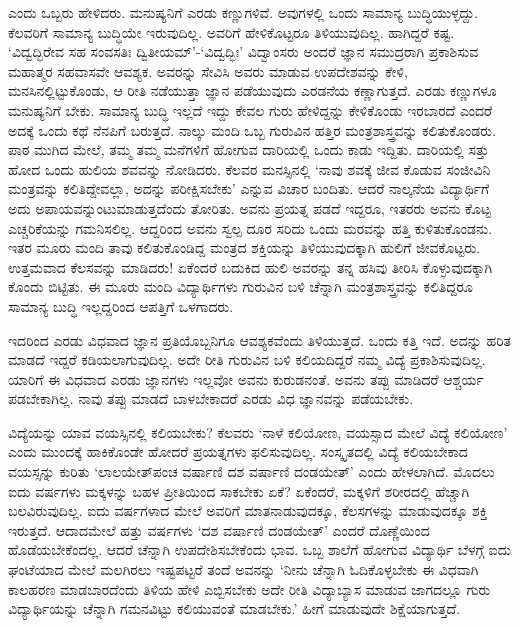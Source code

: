 ಎಂದು ಒಬ್ಬರು ಹೇಳಿದರು. ಮನುಷ್ಯನಿಗೆ ಎರಡು ಕಣ್ಣುಗಳಿವೆ. ಅವುಗಳಲ್ಲಿ ಒಂದು ಸಾಮಾನ್ಯ ಬುದ್ಧಿಯುಳ್ಳದ್ದು. ಕೆಲವರಿಗೆ ಸಾಮಾನ್ಯ ಬುದ್ಧಿಯೇ 
ಇರುವುದಿಲ್ಲ. ಅವರಿಗೆ ಹೇಳಿಕೊಟ್ಟರೂ ತಿಳಿಯುವುದಿಲ್ಲ. ಹಾಗಿದ್ದರೆ ಕಷ್ಟ. `ವಿದ್ವದ್ಭಿರೇವ ಸಹ ಸಂವಸತಿಃ ದ್ವಿತೀಯಮ್'-`ವಿದ್ವದ್ಭಿಃ' ವಿದ್ವಾಂಸರು ಅಂದರೆ ಜ್ಞಾನ 
ಸಮುದ್ರರಾಗಿ ಪ್ರಕಾಶಿಸುವ ಮಹಾತ್ಮರ ಸಹವಾಸವೇ ಆವಶ್ಯಕ. ಅವರನ್ನು ಸೇವಿಸಿ ಅವರು ಮಾಡುವ ಉಪದೇಶವನ್ನು ಕೇಳಿ, ಮನಸಿನಲ್ಲಿಟ್ಟುಕೊಂಡು, ಆ 
ರೀತಿ ನಡೆಯುತ್ತಾ ಜ್ಞಾನ ಪಡೆಯುವುದು ಎರಡನೆಯ ಕಣ್ಣಾಗುತ್ತದೆ. ಎರಡು ಕಣ್ಣುಗಳೂ ಮನುಷ್ಯನಿಗೆ ಬೇಕು. ಸಾಮಾನ್ಯ ಬುದ್ಧಿ ಇಲ್ಲದೆ 
ಇದ್ದು ಕೇವಲ ಗುರು ಹೇಳಿದ್ದನ್ನು ಕೇಳಿಕೊಂಡು ಇರಬಾರದೆ ಎಂದರೆ ಅದಕ್ಕೆ ಒಂದು ಕಥೆ ನೆನಪಿಗೆ ಬರುತ್ತದೆ. ನಾಲ್ಕು ಮಂದಿ ಒಬ್ಬ ಗುರುವಿನ 
ಹತ್ತಿರ ಮಂತ್ರಶಾಸ್ತ್ರವನ್ನು ಕಲಿತುಕೊಂಡರು. ಪಾಠ ಮುಗಿದ ಮೇಲೆ, ತಮ್ಮ ತಮ್ಮ ಮನೆಗಳಿಗೆ ಹೋಗುವ ದಾರಿಯಲ್ಲಿ ಒಂದು ಕಾಡು 
ಇದ್ದಿತು. ದಾರಿಯಲ್ಲಿ ಸತ್ತು ಹೋದ ಒಂದು ಹುಲಿಯ ಶವವನ್ನು ನೋಡಿದರು. ಕೆಲವರ ಮನಸ್ಸಿನಲ್ಲಿ `ನಾವು ಶವಕ್ಕೆ ಜೀವ ಕೊಡುವ ಸಂಜೀವಿನಿ 
ಮಂತ್ರವನ್ನು ಕಲಿತಿದ್ದೇವಲ್ಲಾ, ಅದನ್ನು ಪರೀಕ್ಷಿಸಬೇಕು' ಎನ್ನುವ ವಿಚಾರ ಬಂದಿತು. ಆದರೆ ನಾಲ್ಕನೆಯ ವಿದ್ಯಾರ್ಥಿಗೆ ಅದು 
ಅಪಾಯವನ್ನುಂಟುಮಾಡುತ್ತದೆಂದು ತೋರಿತು. ಅವನು ಪ್ರಯತ್ನ ಪಡದೆ ಇದ್ದರೂ, ಇತರರು ಅವನು ಕೊಟ್ಟ ಎಚ್ಚರಿಕೆಯನ್ನು ಗಮನಿಸಲಿಲ್ಲ. ಆದ್ದರಿಂದ ಅವನು ಸ್ವಲ್ಪ ದೂರ ಸರಿದು ಒಂದು ಮರವನ್ನು ಹತ್ತಿ ಕುಳಿತುಕೊಂಡನು. ಇತರ ಮೂರು ಮಂದಿ ತಾವು ಕಲಿತುಕೊಂಡಿದ್ದ ಮಂತ್ರದ ಶಕ್ತಿಯನ್ನು ತಿಳಿಯುವುದಕ್ಕಾಗಿ ಹುಲಿಗೆ ಜೀವಕೊಟ್ಟರು. ಉತ್ತಮವಾದ ಕೆಲಸವನ್ನು ಮಾಡಿದರು! ಏಕೆಂದರೆ ಬದುಕಿದ ಹುಲಿ ಅವರನ್ನು ತನ್ನ ಹಸಿವು ತೀರಿಸಿ ಕೊಳ್ಳುವುದಕ್ಕಾಗಿ ಕೊಂದು ಬಿಟ್ಟಿತು. ಈ ಮೂರು ಮಂದಿ ವಿದ್ಯಾರ್ಥಿಗಳು ಗುರುವಿನ ಬಳಿ ಚೆನ್ನಾಗಿ ಮಂತ್ರಶಾಸ್ತ್ರವನ್ನು ಕಲಿತಿದ್ದರೂ ಸಾಮಾನ್ಯ ಬುದ್ಧಿ ಇಲ್ಲದ್ದರಿಂದ ಆಪತ್ತಿಗೆ ಒಳಗಾದರು. 

ಇದರಿಂದ ಎರಡು ವಿಧವಾದ ಜ್ಞಾನ ಪ್ರತಿಯೊಬ್ಬನಿಗೂ ಆವಶ್ಯಕವೆಂದು ತಿಳಿಯುತ್ತದೆ. ಒಂದು ಕತ್ತಿ ಇದೆ. ಅದನ್ನು ಹರಿತ ಮಾಡದೆ ಇದ್ದರೆ 
ಕಡಿಯಲಾಗುವುದಿಲ್ಲ. ಅದೇ ರೀತಿ ಗುರುವಿನ ಬಳಿ ಕಲಿಯದಿದ್ದರೆ ನಮ್ಮ ವಿದ್ಯೆ ಪ್ರಕಾಶಿಸುವುದಿಲ್ಲ. ಯಾರಿಗೆ ಈ ವಿಧವಾದ ಎರಡು ಜ್ಞಾನಗಳು 
ಇಲ್ಲವೋ ಅವನು ಕುರುಡನಂತೆ. ಅವನು ತಪ್ಪು ಮಾಡಿದರೆ ಆಶ್ಚರ್ಯ ಪಡಬೇಕಾಗಿಲ್ಲ. ನಾವು ತಪ್ಪು ಮಾಡದೆ ಬಾಳಬೇಕಾದರೆ ಎರಡು ವಿಧ ಜ್ಞಾನವನ್ನು ಪಡೆಯಬೇಕು.

ವಿದ್ಯೆಯನ್ನು ಯಾವ ವಯಸ್ಸಿನಲ್ಲಿ ಕಲಿಯಬೇಕು? ಕೆಲವರು `ನಾಳೆ ಕಲಿಯೋಣ, ವಯಸ್ಸಾದ ಮೇಲೆ ವಿದ್ಯೆ ಕಲಿಯೋಣ' ಎಂದು ಮುಂದಕ್ಕೆ 
ಹಾಕಿಕೊಂಡೇ ಹೋದರೆ ಪ್ರಯತ್ನಗಳು ಫಲಿಸುವುದಿಲ್ಲ. ಸಂಸ್ಕೃತದಲ್ಲಿ ವಿದ್ಯೆ ಕಲಿಯಬೇಕಾದ ವಯಸ್ಸನ್ನು ಕುರಿತು `ಲಾಲಯೇತ್‌ಪಂಚ 
ವರ್ಷಾಣಿ ದಶ ವರ್ಷಾಣಿ ದಂಡಯೇತ್' ಎಂದು ಹೇಳಲಾಗಿದೆ. ಮೊದಲು ಐದು ವರ್ಷಗಳು ಮಕ್ಕಳನ್ನು ಬಹಳ ಪ್ರೀತಿಯಿಂದ ಸಾಕಬೇಕು ಏಕೆ? ಏಕೆಂದರೆ, 
ಮಕ್ಕಳಿಗೆ ಶರೀರದಲ್ಲಿ ಹೆಚ್ಚಾಗಿ ಬಲವಿರುವುದಿಲ್ಲ. ಐದು ವರ್ಷಗಳಾದ ಮೇಲೆ ಅವರಿಗೆ ಮಾತನಾಡುವುದಕ್ಕೂ, ಕೆಲಸಗಳನ್ನು ಮಾಡುವುದಕ್ಕೂ 
ಶಕ್ತಿ ಇರುತ್ತದೆ. ಆದಾದಮೇಲೆ ಹತ್ತು ವರ್ಷಗಳು `ದಶ ವರ್ಷಾಣಿ ದಂಡಯೇತ್' ಎಂದರೆ ದೊಣ್ಣೆಯಿಂದ ಹೊಡೆಯಬೇಕೆಂದಲ್ಲ. ಆದರೆ 
ಚೆನ್ನಾಗಿ ಉಪದೇಶಿಸಬೇಕೆಂದು ಭಾವ. ಒಬ್ಬ ಶಾಲೆಗೆ ಹೋಗುವ ವಿದ್ಯಾರ್ಥಿ ಬೆಳಗ್ಗೆ ಐದು ಘಂಟೆಯಾದ ಮೇಲೆ ಮಲಗಿರಲು ಇಷ್ಟಪಟ್ಟರೆ ತಂದೆ ಅವನನ್ನು 
`ನೀನು ಚೆನ್ನಾಗಿ ಓದಿಕೊಳ್ಳಬೇಕು ಈ ವಿಧವಾಗಿ ಕಾಲಹರಣ ಮಾಡಬಾರದೆಂದು ತಿಳಿಯ ಹೇಳಿ ಎಬ್ಬಿಸಬೇಕು ಅದೇ ರೀತಿ ವಿದ್ಯಾಬ್ಯಾಸ ಮಾಡುವ ಜಾಗದಲ್ಲೂ ಗುರು 
ವಿದ್ಯಾರ್ಥಿಯನ್ನು ಚೆನ್ನಾಗಿ ಗಮನವಿಟ್ಟು ಕಲಿಯುವಂತೆ ಮಾಡಬೇಕು.' ಹೀಗೆ ಮಾಡುವುದೇ ಶಿಕ್ಷೆಯಾಗುತ್ತದೆ.    

